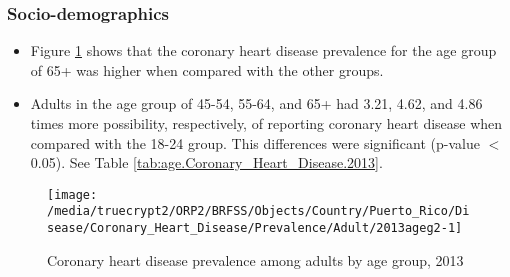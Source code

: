 
\newpage
\subsubsection{Socio-demographics}

\begin{itemize}

\item Figure \ref{fig:age.Coronary_Heart_Disease.2013} shows that the coronary heart disease prevalence for the age group of
65+
was higher when compared with the other groups.

\item Adults in the age group of 45-54, 55-64, and 65+ had 3.21, 4.62, and 4.86 times more possibility, respectively, of reporting coronary heart disease when compared with the 18-24 group. This differences were significant (p-value $<$ 0.05). See Table \ref{tab:age.Coronary_Heart_Disease.2013}.


\end{itemize}


\begin{figure}[H]
\caption{Coronary heart disease prevalence among adults by age group, 
2013}
\begin{knitrout}
\color{fgcolor}

{\centering \texttt{[image: /media/truecrypt2/ORP2/BRFSS/Objects/Country/Puerto\_Rico/Disease/Coronary\_Heart\_Disease/Prevalence/Adult/2013ageg2-1]} 

}



\end{knitrout}
\label{fig:age.Coronary_Heart_Disease.2013}
\end{figure}


